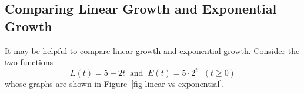 \documentclass[10pt,]{book}
\theoremstyle{plain}
\theoremstyle{definition}
\theoremstyle{definition}
\theoremstyle{definition}
\theoremstyle{definition}
\theoremstyle{definition}
\numberwithin{equation}{section}
\newcommand{\hrulethin}  {\noalign{\hrule height 0.04em}}
\newcommand{\hrulethick} {\noalign{\hrule height 0.11em}}
\newcounter{figstack}
\newlength\fight
\newcommand\pushValignCaptionBottom[5][b]{%
\stepcounter{figstack}%
\expandafter\def\csname %
figalign\romannumeral\value{figstack}\endcsname{#1}%
\expandafter\def\csname %
figtype\romannumeral\value{figstack}\endcsname{#2}%
\expandafter\def\csname %
figwd\romannumeral\value{figstack}\endcsname{#3}%
\expandafter\def\csname %
figcontent\romannumeral\value{figstack}\endcsname{#4}%
\expandafter\def\csname %
figcap\romannumeral\value{figstack}\endcsname{#5}%
\setbox0=\hbox{%
\begin{#2}{#3}#4\end{#2}}%
\ifdim\dimexpr\ht0+\dp0\relax>\fight\global\setlength{\fight}{%
\dimexpr\ht0+\dp0\relax}\fi%
}
\begin{document}
\subsection[Comparing Linear Growth and Exponential Growth]{Comparing Linear Growth and Exponential Growth}\label{subsection-90}

    It may be helpful to compare linear growth \index{} and \index{} exponential growth. Consider the two functions
    \begin{equation*}L(t) = 5 + 2t ~\text{ and } ~ E(t) = 5 \cdot 2^t ~~~ (t \ge 0)\end{equation*}
    whose graphs are shown in \hyperref[fig-linear-vs-exponential]{Figure~\ref{fig-linear-vs-exponential}}.
%
\leavevmode%
\end{document}
